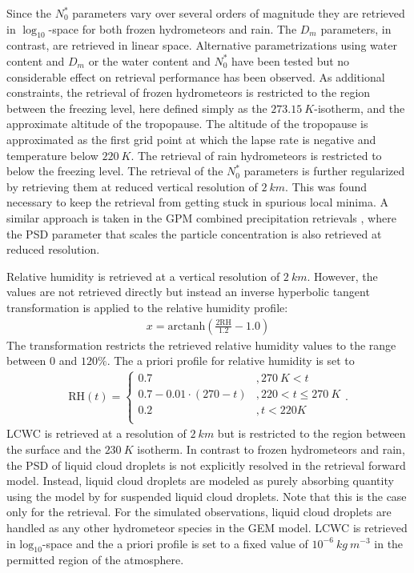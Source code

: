 \documentclass[journal abbreviation, manuscript]{copernicus}
\begin{document}
Since the $N_0^*$ parameters vary over several orders of magnitude they are
retrieved in $\log_{10}$-space for both frozen hydrometeors and rain. The $D_m$
parameters, in contrast, are retrieved in linear space. Alternative
parametrizations using water content and $D_m$ or the water content and $N_0^*$
have been tested but no considerable effect on retrieval performance has been
observed. As additional constraints, the retrieval of frozen hydrometeors is
restricted to the region between the freezing level, here defined simply as the
$273.15\ \unit{K}$-isotherm, and the approximate altitude of the tropopause. The
altitude of the tropopause is approximated as the first grid point at which the
lapse rate is negative and temperature below $220\ \unit{K}$. The retrieval of
rain hydrometeors is restricted to below the freezing level. The retrieval of
the $N_0^*$ parameters is further regularized by retrieving them at reduced
vertical resolution of $2\ \unit{km}$. This was found necessary to keep the
retrieval from getting stuck in spurious local minima. A similar approach is
taken in the GPM combined precipitation retrievals \citep{grecu16}, where the
PSD parameter that scales the particle concentration is also retrieved at
reduced resolution.

Relative humidity is retrieved at a vertical resolution of $2\ \unit{km}$.
However, the values are not retrieved directly but instead an inverse
hyperbolic tangent transformation is applied to the relative humidity profile:
%
\begin{align}
x = \text{arctanh}(\frac{2 \text{RH}}{1.2} - 1.0)
\end{align}
%
The transformation restricts the retrieved relative humidity values to the range
between $0$ and $120\%$. The a priori profile for relative humidity is set to
%
\begin{align}
\text{RH}(t) = \begin{cases}
 0.7 &, 270\ \unit{K} < t \\
 0.7 - 0.01 \cdot (270 -t) & ,220 < t \leq  270\ \unit{K} \\
 0.2 &,t < 220 \unit{K} \\
 \end{cases}.
\end{align}
%
LCWC is retrieved at a resolution of $2\ \unit{km}$ but is restricted to the
region between the surface and the $230\ \unit{K}$ isotherm. In contrast to
frozen hydrometeors and rain, the PSD of liquid cloud droplets is not explicitly
resolved in the retrieval forward model. Instead, liquid cloud droplets are
modeled as purely absorbing quantity using the model by \cite{liebe93} for
suspended liquid cloud droplets. Note that this is the case only for the
retrieval. For the simulated observations, liquid cloud droplets are
handled as any other hydrometeor species in the GEM model. LCWC is retrieved in
$\text{log}_{10}$-space and the a priori profile is set to a fixed value of
$10^{-6}\ \unit{kg\ m^{-3}}$ in the permitted region of the atmosphere.
\end{document}
